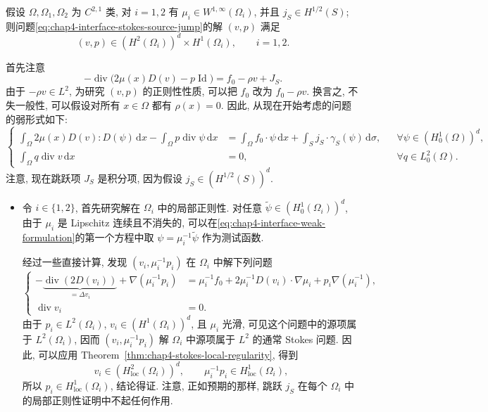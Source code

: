 \begin{Theorem}
\label{thm:chap4-interface-piecewise-regularity}
假设 $\Omega,\Omega_1,\Omega_2$ 为 $C^{2,1}$ 类, 对 $i=1,2$ 有 $\mu_i\in W^{1,\infty}(\Omega_i)$, 并且 $j_S\in H^{1/2}(S)$; 则问题\eqref{eq:chap4-interface-stokes-source-jump}的解 $(v,p)$ 满足
\[
 (v,p)\in(H^2(\Omega_i))^d\times H^1(\Omega_i),
 \qquad i=1,2.
\]
\end{Theorem}

\begin{Proof}
首先注意
\[
 -\operatorname{div}\bigl(2\mu(x)D(v)-p\operatorname{Id}\bigr)=f_0-\rho v+J_S.
\]
由于 $-\rho v\in L^2$, 为研究 $(v,p)$ 的正则性性质, 可以把 $f_0$ 改为 $f_0-\rho v$. 换言之, 不失一般性, 可以假设对所有 $x\in\Omega$ 都有 $\rho(x)=0$. 因此, 从现在开始考虑的问题的弱形式如下:
\begin{equation}
 \left\{
 \begin{aligned}
  \int_\Omega2\mu(x)D(v):D(\psi)\,\mathrm dx
  -\int_\Omega p\operatorname{div}\psi\,\mathrm dx
  &=\int_\Omega f_0\cdot\psi\,\mathrm dx
  +\int_S j_S\cdot\gamma_S(\psi)\,\mathrm d\sigma,
  &&\forall\psi\in(H_0^1(\Omega))^d,\\
  \int_\Omega q\operatorname{div}v\,\mathrm dx&=0,
  &&\forall q\in L_0^2(\Omega).
 \end{aligned}
 \right.
 \label{eq:chap4-interface-weak-formulation}
\end{equation}
注意, 现在跳跃项 $J_S$ 是积分项, 因为假设 $j_S\in(H^{1/2}(S))^d$.

\begin{itemize}
\item 令 $i\in\{1,2\}$, 首先研究解在 $\Omega_i$ 中的局部正则性. 对任意 $\widetilde\psi\in(H_0^1(\Omega_i))^d$, 由于 $\mu_i$ 是 Lipschitz 连续且不消失的, 可以在\eqref{eq:chap4-interface-weak-formulation}的第一个方程中取 $\psi=\mu_i^{-1}\widetilde\psi$ 作为测试函数.

经过一些直接计算, 发现 $(v_i,\mu_i^{-1}p_i)$ 在 $\Omega_i$ 中解下列问题
\begin{equation}
 \left\{
 \begin{aligned}
  -\underbrace{\operatorname{div}(2D(v_i))}_{=\Delta v_i}
  +\nabla(\mu_i^{-1}p_i)
  &=\mu_i^{-1}f_0+2\mu_i^{-1}D(v_i)\cdot\nabla\mu_i
  +p_i\nabla(\mu_i^{-1}),\\
  \operatorname{div}v_i&=0.
 \end{aligned}
 \right.
 \label{eq:chap4-interface-local-stokes}
\end{equation}
由于 $p_i\in L^2(\Omega_i)$, $v_i\in(H^1(\Omega_i))^d$, 且 $\mu_i$ 光滑, 可见这个问题中的源项属于 $L^2(\Omega_i)$, 因而 $(v_i,\mu_i^{-1}p_i)$ 解 $\Omega_i$ 中源项属于 $L^2$ 的通常 Stokes 问题. 因此, 可以应用 Theorem~\ref{thm:chap4-stokes-local-regularity}, 得到
\[
 v_i\in(H_{\mathrm{loc}}^2(\Omega_i))^d,
 \qquad \mu_i^{-1}p_i\in H_{\mathrm{loc}}^1(\Omega_i),
\]
所以 $p_i\in H_{\mathrm{loc}}^1(\Omega_i)$, 结论得证. 注意, 正如预期的那样, 跳跃 $j_S$ 在每个 $\Omega_i$ 中的局部正则性证明中不起任何作用.


\end{itemize}
\end{Proof}
